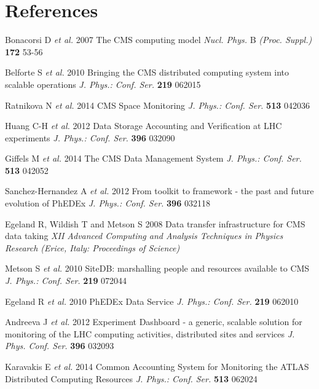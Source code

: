 \section*{References}

\begin{thebibliography}{1}

 Bonacorsi D {\it et al.} 2007 The CMS computing model 
{\it Nucl. Phys.} B {\it (Proc. Suppl.)} {\bf 172} 53-56

 Belforte S {\it et al.} 2010 Bringing the CMS distributed computing system into scalable operations 
{\it J. Phys.: Conf. Ser.} {\bf 219} 062015

Ratnikova N {\it et al.} 2014 CMS Space Monitoring {\it J. Phys.: Conf. Ser.} {\bf 513} 042036 

Huang C-H {\it et al.} 2012 Data Storage Accounting and Verification at LHC experiments 
{\it J. Phys.: Conf. Ser.} {\bf 396} 032090

Giffels M {\it et al.} 2014 The CMS Data Management System {\it J. Phys.: Conf. Ser.} {\bf 513} 042052

Sanchez-Hernandez A {\it et al.} 2012 From toolkit to framework - the past and future evolution of PhEDEx  
{\it J. Phys.: Conf. Ser.} {\bf 396} 032118 

Egeland R, Wildish T and Metson S 2008 Data transfer infrastructure for CMS data taking 
{\it XII Advanced Computing and Analysis Techniques in Physics Research (Erice, Italy: Proceedings of Science)}


Metson S {\it et al.} 2010 SiteDB: marshalling people and resources available to CMS
{\it J. Phys.: Conf. Ser.} {\bf 219} 072044


Egeland  R {\it et al.} 2010  PhEDEx Data Service 
{\it J. Phys.: Conf. Ser.} {\bf 219} 062010

  Andreeva J {\it et al.} 2012 Experiment Dashboard - a generic, scalable solution for 
monitoring of the LHC computing activities, distributed sites and services 
{\it J. Phys. Conf. Ser.} {\bf 396} 032093


Karavakis E {\it et al.}  2014 Common Accounting System for Monitoring the ATLAS 
Distributed Computing Resources
{\it J. Phys.: Conf. Ser.} {\bf 513} 062024

\end{thebibliography}
